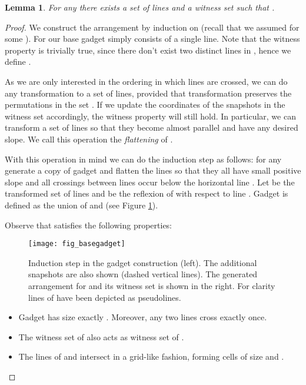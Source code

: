\documentclass[11pt,a4paper]{article}
\newtheorem{lemma}[theorem]{Lemma}
\begin{document}
\begin{lemma}\label{LB:basicgad}
For any  there exists a set  of  lines and a witness set  such that .
\end{lemma}
\begin{proof}
We construct the arrangement by induction on  (recall that we assumed  for some ). For  our base gadget  simply consists of a single line. Note that the witness property is trivially true, since there don't exist two distinct lines in , hence we define .

As we are only interested in the ordering in which lines are crossed, we can do any transformation to a set  of lines, provided that  transformation preserves the permutations in the set . If we update the coordinates of the snapshots in the witness set accordingly, the witness property will still hold. In particular, we can transform a set  of lines so that they become almost parallel and have any desired slope. We call this operation the {\em flattening} of .

With this operation in mind we can do the induction step as follows: for any  generate a copy of gadget  and flatten the lines so that they all have small positive slope and all crossings between lines occur below the horizontal line . Let  be the transformed set of lines and  be the reflexion of  with respect to line . Gadget  is defined as the union of  and  (see Figure \ref{fig_basegadget}).

Observe that  satisfies the following properties:
\begin{figure}
   \begin{center}
     \texttt{[image: fig\_basegadget]}
     \caption{Induction step in the gadget  construction (left). The additional snapshots are also shown  (dashed vertical lines). The generated arrangement for  and its witness set is shown in the right. For clarity lines of  have been depicted as pseudolines.}
     \label{fig_basegadget}
   \end{center}
\end{figure}

\begin{itemize}
\item[]  Gadget  has size exactly . Moreover, any two lines cross exactly once.
\item[]  The witness set  of  also acts as witness set of .
\item[]  The lines of  and  intersect in a grid-like fashion, forming cells of size  and . \end{itemize}


\end{proof}
\end{document}
